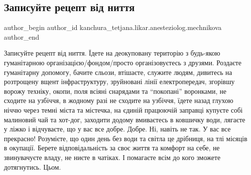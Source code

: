  
 
 
 
 

\subsection{Записуйте рецепт від ниття}
\label{sec:25_11_2022.fb.kanchura_tetjana.likar.anesteziolog.mechnikova.1.zapisuite_retsept_v_}

\ifcmt
 author_begin
   author_id kanchura_tetjana.likar.anesteziolog.mechnikova
 author_end
\fi

Записуйте рецепт від ниття. Їдете на деокуповану територію з будь-якою
гуманітарною організацією/фондом/просто організовуєтесь з друзями. Роздаєте
гуманітарну допомогу, бачите сльози, втішаєте, служите людям, дивитесь на
розтрощену вщент інфраструктуру, зруйновані лінії електропередач, згорівшу
ворожу техніку, окопи, поля всіяні снарядами та \enquote{покопані} воронками, не
сходите на узбіччя, в жодному разі не сходите на узбіччя, їдете назад глухою
ніччю через темні міста та містечка, на єдиній працюючій заправці купуєте собі
малиновий чай та хот-дог, заходити додому вмиваєтесь в ковшичку води, лягаєте у
ліжко і відчуваєте, що у вас все добре. Добре. Ні, навіть не так. У вас все
прекрасно! Розумієте, що один день без води та світла це дрібниця, на тлі
місяців в окупації. Берете відповідальність за своє життя та комфорт на себе,
не звинувачуєте владу, не ниєте в чатіках. І помагаєте всім до кого зможете
дотягнутись. Цьом.
